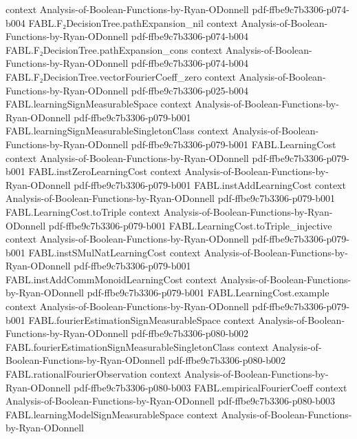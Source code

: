 \begin{theorem}
  {context}
  {Analysis-of-Boolean-Functions-by-Ryan-ODonnell}
  {pdf-ffbe9c7b3306-p074-b004}
\proofstep
  {FABL.F₂DecisionTree.pathExpansion_nil}
  {context}
  {Analysis-of-Boolean-Functions-by-Ryan-ODonnell}
  {pdf-ffbe9c7b3306-p074-b004}
\proofstep
  {FABL.F₂DecisionTree.pathExpansion_cons}
  {context}
  {Analysis-of-Boolean-Functions-by-Ryan-ODonnell}
  {pdf-ffbe9c7b3306-p074-b004}
\proofstep
  {FABL.F₂DecisionTree.vectorFourierCoeff_zero}
  {context}
  {Analysis-of-Boolean-Functions-by-Ryan-ODonnell}
  {pdf-ffbe9c7b3306-p025-b004}
\proofstep
  {FABL.learningSignMeasurableSpace}
  {context}
  {Analysis-of-Boolean-Functions-by-Ryan-ODonnell}
  {pdf-ffbe9c7b3306-p079-b001}
\proofstep
  {FABL.learningSignMeasurableSingletonClass}
  {context}
  {Analysis-of-Boolean-Functions-by-Ryan-ODonnell}
  {pdf-ffbe9c7b3306-p079-b001}
\proofstep
  {FABL.LearningCost}
  {context}
  {Analysis-of-Boolean-Functions-by-Ryan-ODonnell}
  {pdf-ffbe9c7b3306-p079-b001}
\proofstep
  {FABL.instZeroLearningCost}
  {context}
  {Analysis-of-Boolean-Functions-by-Ryan-ODonnell}
  {pdf-ffbe9c7b3306-p079-b001}
\proofstep
  {FABL.instAddLearningCost}
  {context}
  {Analysis-of-Boolean-Functions-by-Ryan-ODonnell}
  {pdf-ffbe9c7b3306-p079-b001}
\proofstep
  {FABL.LearningCost.toTriple}
  {context}
  {Analysis-of-Boolean-Functions-by-Ryan-ODonnell}
  {pdf-ffbe9c7b3306-p079-b001}
\proofstep
  {FABL.LearningCost.toTriple_injective}
  {context}
  {Analysis-of-Boolean-Functions-by-Ryan-ODonnell}
  {pdf-ffbe9c7b3306-p079-b001}
\proofstep
  {FABL.instSMulNatLearningCost}
  {context}
  {Analysis-of-Boolean-Functions-by-Ryan-ODonnell}
  {pdf-ffbe9c7b3306-p079-b001}
\proofstep
  {FABL.instAddCommMonoidLearningCost}
  {context}
  {Analysis-of-Boolean-Functions-by-Ryan-ODonnell}
  {pdf-ffbe9c7b3306-p079-b001}
\proofstep
  {FABL.LearningCost.example}
  {context}
  {Analysis-of-Boolean-Functions-by-Ryan-ODonnell}
  {pdf-ffbe9c7b3306-p079-b001}
\proofstep
  {FABL.fourierEstimationSignMeasurableSpace}
  {context}
  {Analysis-of-Boolean-Functions-by-Ryan-ODonnell}
  {pdf-ffbe9c7b3306-p080-b002}
\proofstep
  {FABL.fourierEstimationSignMeasurableSingletonClass}
  {context}
  {Analysis-of-Boolean-Functions-by-Ryan-ODonnell}
  {pdf-ffbe9c7b3306-p080-b002}
\proofstep
  {FABL.rationalFourierObservation}
  {context}
  {Analysis-of-Boolean-Functions-by-Ryan-ODonnell}
  {pdf-ffbe9c7b3306-p080-b003}
\proofstep
  {FABL.empiricalFourierCoeff}
  {context}
  {Analysis-of-Boolean-Functions-by-Ryan-ODonnell}
  {pdf-ffbe9c7b3306-p080-b003}
\proofstep
  {FABL.learningModelSignMeasurableSpace}
  {context}
  {Analysis-of-Boolean-Functions-by-Ryan-ODonnell}

\end{theorem}
